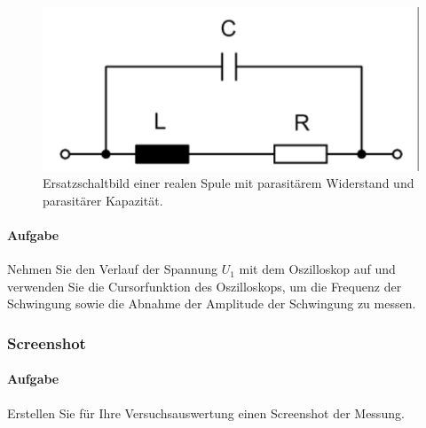 \documentclass[10pt]{scrreprt}
\begin{document}
        \begin{center}
            \begin{figure}[H]
                \includegraphics[width=\textwidth]{Abbildung15.png}
                \caption{Ersatzschaltbild einer realen Spule mit parasitärem Widerstand und parasitärer Kapazität.}
                \label{fig:abb15}
            \end{figure}
        \end{center}

        \paragraph{Aufgabe}
        Nehmen Sie den Verlauf der Spannung $U_1$ mit dem Oszilloskop auf und verwenden
        Sie die Cursorfunktion des Oszilloskops, um die Frequenz der Schwingung sowie die
        Abnahme der Amplitude der Schwingung zu messen.

        \subsubsection{Screenshot}
        \paragraph{Aufgabe}
        Erstellen Sie für Ihre Versuchsauswertung einen Screenshot der Messung.
\end{document}
